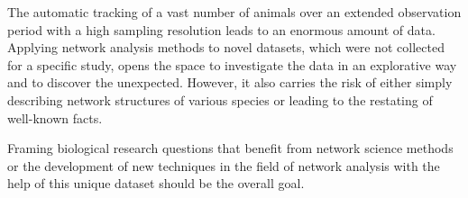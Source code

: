 The automatic tracking of a vast number of animals over an extended observation period with a high sampling resolution leads to an enormous amount of data.
Applying network analysis methods to novel datasets, which were not collected for a specific study, opens the space to investigate the data in an explorative way and to discover the unexpected.
However, it also carries the risk of either simply describing network structures of various species or leading to the restating of well-known facts.

Framing biological research questions that benefit from network science methods or the development of new techniques in the field of network analysis with the help of this unique dataset should be the overall goal.



